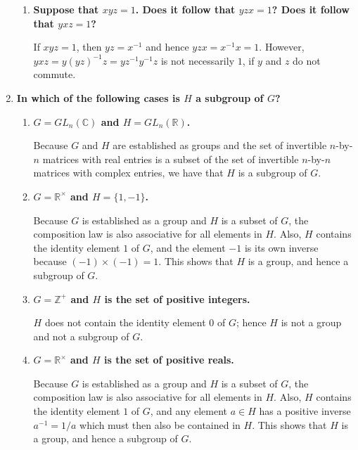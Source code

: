 \documentclass[a4paper,12pt]{article}
\begin{document}
\begin{enumerate}
\begin{enumerate}
            \item
                \boldmath
                \textbf{Suppose that $xyz = 1$. Does it follow that $yzx = 1$? Does it follow that $yxz = 1$?} \par
                \unboldmath
                If $xyz = 1$, then $yz = x^{-1}$ and hence $yzx = x^{-1} x = 1$. However, $yxz = y(yz)^{-1} z = yz^{-1} y^{-1} z$ is not necessarily $1$, if $y$ and $z$ do not commute.
        \end{enumerate}

    \item
        \boldmath
        \textbf{In which of the following cases is $H$ a subgroup of $G$?} \par
        \unboldmath
        \begin{enumerate}
            \item
                \boldmath
                \textbf{$G = GL_n(\mathbb{C})$ and $H = GL_n(\mathbb{R})$.} \par
                \unboldmath
                Because $G$ and $H$ are established as groups and the set of invertible $n$-by-$n$ matrices with real entries is a subset of the set of invertible $n$-by-$n$ matrices with complex entries, we have that $H$ is a subgroup of $G$.

            \item
                \boldmath
                \textbf{$G = \mathbb{R}^\times$ and $H = \{ 1, -1 \}$.} \par
                \unboldmath
                Because $G$ is established as a group and $H$ is a subset of $G$, the composition law is also associative for all elements in $H$. Also, $H$ contains the identity element $1$ of $G$, and the element $-1$ is its own inverse because $(-1) \times (-1) = 1$. This shows that $H$ is a group, and hence a subgroup of $G$.

            \item
                \boldmath
                \textbf{$G = \mathbb{Z}^+$ and $H$ is the set of positive integers.} \par
                \unboldmath
                $H$ does not contain the identity element $0$ of $G$; hence $H$ is not a group and not a subgroup of $G$.

            \item
                \boldmath
                \textbf{$G = \mathbb{R}^\times$ and $H$ is the set of positive reals.} \par
                \unboldmath
                Because $G$ is established as a group and $H$ is a subset of $G$, the composition law is also associative for all elements in $H$. Also, $H$ contains the identity element $1$ of $G$, and any element $a \in H$ has a positive inverse $a^{-1} = 1/a$ which must then also be contained in $H$. This shows that $H$ is a group, and hence a subgroup of $G$.


\end{enumerate}
\end{enumerate}
\end{document}
